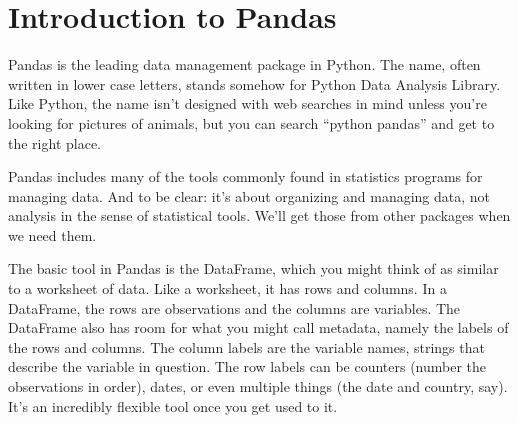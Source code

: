 \documentclass[11pt]{article}
\begin{document}
\section{Introduction to Pandas}

Pandas is the leading data management package in Python.
The name, often written in lower case letters,
stands somehow for Python Data Analysis Library.
Like Python, the name isn't designed with web searches in mind
unless you're looking for pictures of animals,
but you can search ``python pandas'' and get to the right place.

Pandas includes many of the tools commonly found in statistics programs
for managing data.
And to be clear:   it's about organizing and managing data, not
analysis in the sense of statistical tools.
We'll get those from other packages when we need them.

The basic tool in Pandas is the DataFrame,
which you might think of as similar to a worksheet of data.
Like a worksheet, it has rows and columns.
In a DataFrame, the rows are observations and the columns are variables.
The DataFrame also has room for what you might call metadata,
namely the labels of the rows and columns.
The column labels are the variable names, strings that describe
the variable in question.
The row labels can be counters (number the observations in order),
dates, or even multiple things (the date and country, say).
It's an incredibly flexible tool once you get used to it.
\end{document}
